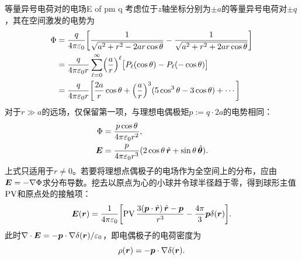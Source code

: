 \begin{example}{等量异号电荷对的电场}{E of pm q}
    考虑位于$z$轴坐标分别为$\pm a$的等量异号电荷对$\pm q$，其在空间激发的电势为
    \begin{align*}
        \Phi &= \frac q{4\pi\varepsilon_0}\biggl[\frac1{\sqrt{a^2 + r^2 - 2ar\cos\theta}} - \frac1{\sqrt{a^2 + r^2 + 2ar\cos\theta}}\biggr]\\
        &= \frac q{4\pi\varepsilon_0r}\sum_{\ell=0}^\infty\Bigl(\frac ar\Bigr)^\ell\bigl[P_{\ell}(\cos\theta) - P_\ell(-\cos\theta)\bigr]\\
        &= \frac q{4\pi\varepsilon_0r}\biggl[\frac{2a}r\cos\theta + \Bigl(\frac ar\Bigr)^3(5\cos^3\theta - 3\cos\theta) + \cdots\biggr]
    \end{align*}
    对于$r \gg a$的远场，仅保留第一项，与理想电偶极矩$p := q \cdot 2a$的电势相同：
    \begin{subequations}
        \begin{align}
            \label{eqn:Phi dipole}
            \Phi &= \frac{p\cos\theta}{4\pi\varepsilon_0r^2},\\
            \label{eqn:E dipole}
            \bm E &= \frac p{4\pi\varepsilon_0r^3}(2\cos\theta\mathop{}\!\hat{\bm{r}} + \sin\theta\mathop{}\!\hat{\bm{\theta}}).
        \end{align}
    \end{subequations}
    上式只适用于$r \neq 0$。若要将理想点偶极子的电场作为全空间上的分布，应由$\bm E = -\nabla\Phi$求分布导数。挖去以原点为心的小球并令球半径趋于零，得到球形主值$\operatorname{PV}$和原点处的接触项：
    \begin{equation}
        \label{eqn:E dipole with delta}
        \bm E(\bm r) = \frac1{4\pi\varepsilon_0}\biggl[\operatorname{PV}\frac{3(\bm p \cdot \mathop{}\!\hat{\bm{r}})\mathop{}\!\hat{\bm{r}} - \bm p}{r^3} - \frac{4\pi}3\bm p\delta(\bm r)\biggr].
    \end{equation}
    此时$\nabla\cdot\bm E = -\bm p \cdot \nabla\delta(\bm r)/\varepsilon_0$，即电偶极子的电荷密度为
    \begin{equation}
        \rho(\bm r) = -\bm p \cdot \nabla\delta(\bm r).
    \end{equation}
\end{example}

